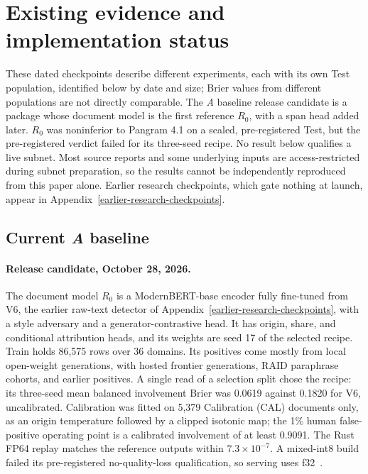\section{Existing evidence and implementation
status}\label{existing-evidence-and-implementation-status}

These dated checkpoints describe different experiments, each with its own
Test population, identified below by date and size; Brier values from different
populations are not directly comparable. The \textit{A} baseline release
candidate is a package whose document model is the first reference
\(R_0\), with a span head added later. \(R_0\) was noninferior
to Pangram 4.1 on a sealed, pre-registered Test, but the pre-registered verdict
failed for its three-seed recipe. No result below qualifies a live subnet. Most
source reports and some underlying inputs are access-restricted during subnet
preparation, so the results cannot be independently reproduced from this paper
alone. Earlier research checkpoints, which gate nothing at launch, appear in
Appendix~\ref{earlier-research-checkpoints}.

\subsection{Current \textit{A} baseline}\label{current-a-baseline}

\paragraph{Release candidate, October 28, 2026.}
The document model \(R_0\) is a ModernBERT-base encoder fully fine-tuned from V6, the
earlier raw-text detector of Appendix~\ref{earlier-research-checkpoints}, with a
style adversary and a
generator-contrastive head. It has origin, share, and conditional attribution
heads, and its weights are seed 17 of the selected recipe. Train holds
86,575 rows over 36 domains. Its positives come mostly from local open-weight
generations, with hosted frontier generations, RAID paraphrase cohorts, and
earlier positives. A single
read of a selection split chose the recipe: its three-seed mean balanced
involvement Brier was 0.0619 against 0.1820 for V6, uncalibrated. Calibration
was fitted on 5,379 Calibration (CAL) documents only, as an origin temperature
followed by a clipped isotonic map; the 1\% human false-positive operating point
is a calibrated involvement of at least 0.9091. The Rust FP64 replay matches the
reference outputs within \(7.3\times10^{-7}\). A mixed-int8 build failed its
pre-registered no-quality-loss qualification, so serving uses f32~\cite{baselinerelease}.

